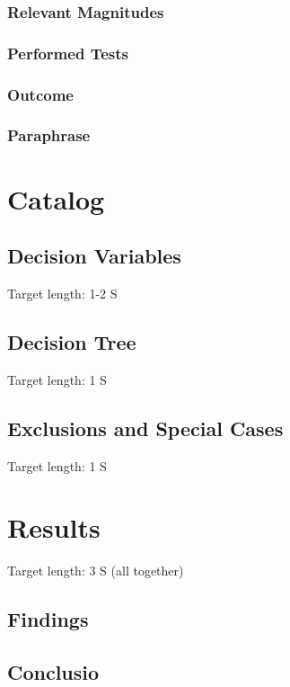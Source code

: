 \documentclass[MSC,Master,english]{twbook}%
\begin{document}
\subsection{Relevant Magnitudes}
\subsection{Performed Tests}
\subsection{Outcome}
\subsection{Paraphrase}



\chapter{Catalog}
\label{chap:catalog}

\section{Decision Variables}
\label{sec:variables}
Target length: 1-2 S

\section{Decision Tree}
\label{sec:tree}
Target length: 1 S

\section{Exclusions and Special Cases}
\label{sec:exclusions}
Target length: 1 S


\chapter{Results}
\label{chap:results}

Target length: 3 S (all together)
\section{Findings}
\label{sec:findings}

\section{Conclusio}
\label{sec:conclusio}
\end{document}
